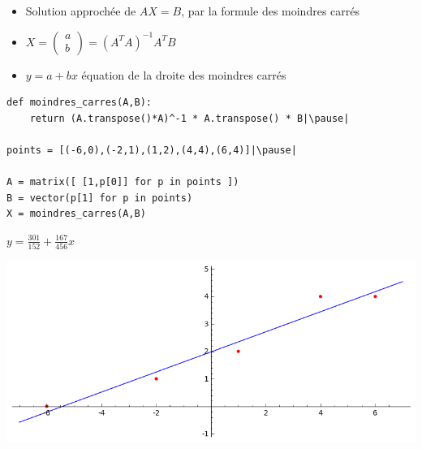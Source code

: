 \begin{frame}
 \pause
  
\begin{itemize}
  \item Solution approchée de $AX = B$, par la formule des moindres carrés
  \pause
  \item $X = \left(\begin{smallmatrix}a\\b\end{smallmatrix}\right) = (A^TA)^{-1} A^T B$
  \pause
  \item $y=a + bx$ équation de la droite des moindres carrés
\end{itemize}

\end{frame}



\begin{frame}[fragile]
  
\begin{algo}
\begin{lstlisting}
def moindres_carres(A,B):
    return (A.transpose()*A)^-1 * A.transpose() * B|\pause|

points = [(-6,0),(-2,1),(1,2),(4,4),(6,4)]|\pause|

A = matrix([ [1,p[0]] for p in points ])
B = vector(p[1] for p in points)
X = moindres_carres(A,B)
\end{lstlisting}
\end{algo} 

\pause

\begin{minipage}{0.29\textwidth}
$y = \frac{301}{152} + \frac{167}{456}x$
\end{minipage}
\begin{minipage}{0.49\textwidth}
\includegraphics[scale=0.4]{figures/moindres_carres1}
\end{minipage}


    

\end{frame}


